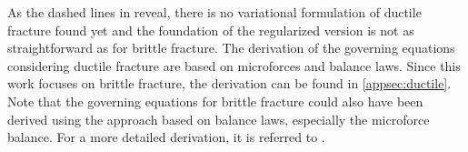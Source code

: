 \begin{table}[!ht]
\begin{center}
\begin{tabular}{|c||c|c|c|}
		\hline
	\end{tabular}
	\end{center}
 \label{fig:plastic}
\end{table}

As the dashed lines in  reveal, there is no variational formulation of ductile fracture found yet and the foundation of the regularized version is not as straightforward as for brittle fracture. The derivation of the governing equations considering ductile fracture are based on microforces and balance laws. Since this work focuses on brittle fracture, the derivation can be found in \ref{appsec:ductile}. Note that the governing equations for brittle fracture could also have been derived using the approach based on balance laws, especially the microforce balance. For a more detailed derivation, it is referred to \citep{11_PF_DissBorden}. 
